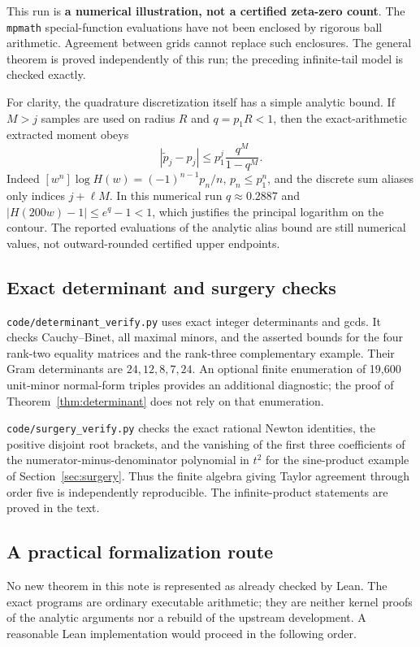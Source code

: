 This run is \textbf{a numerical illustration, not a certified zeta-zero
count}. The \texttt{mpmath} special-function evaluations have not been
enclosed by rigorous ball arithmetic. Agreement between grids cannot
replace such enclosures. The general theorem is proved independently of
this run; the preceding infinite-tail model is checked exactly.

For clarity, the quadrature discretization itself has a simple analytic
bound. If $M>j$ samples are used on radius $R$ and $q=p_1R<1$, then the
exact-arithmetic extracted moment obeys
\[
 |\widetilde p_j-p_j|\le p_1^j\frac{q^M}{1-q^M}.
\]
Indeed $[w^n]\log H(w)=(-1)^{n-1}p_n/n$, $p_n\le p_1^n$, and the
discrete sum aliases only indices $j+\ell M$. In this numerical run
$q\approx0.2887$ and $|H(200w)-1|\le e^q-1<1$, which justifies the
principal logarithm on the contour. The reported evaluations of the
analytic alias bound are still numerical values, not outward-rounded
certified upper endpoints.

\subsection{Exact determinant and surgery checks}

\texttt{code/determinant\_verify.py} uses exact integer determinants and gcds.
It checks Cauchy--Binet, all maximal minors, and the asserted bounds for the
four rank-two equality matrices and the rank-three complementary example.
Their Gram determinants are $24,12,8,7,24$. An optional finite enumeration
of 19,600 unit-minor normal-form triples provides an additional diagnostic;
the proof of Theorem~\ref{thm:determinant} does not rely on that enumeration.

\texttt{code/surgery\_verify.py} checks the exact rational Newton identities,
the positive disjoint root brackets, and the vanishing of the first three
coefficients of the numerator-minus-denominator polynomial in $t^2$ for
the sine-product example of Section~\ref{sec:surgery}. Thus the finite
algebra giving Taylor agreement through order five is independently
reproducible. The infinite-product statements are proved in the text.

\subsection{A practical formalization route}

No new theorem in this note is represented as already checked by Lean.
The exact programs are ordinary executable arithmetic; they are neither
kernel proofs of the analytic arguments nor a rebuild of the upstream
development. A reasonable Lean implementation would proceed in the
following order.

